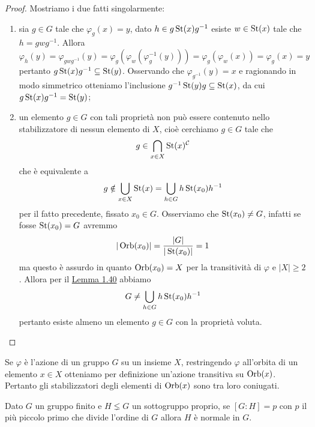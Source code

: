 \documentclass[11pt]{scrartcl}
\begin{document}
\begin{proof}
    Mostriamo i due fatti singolarmente:
    \begin{enumerate}[(1)]
        \item sia $g \in G$ tale che $\varphi_g(x) = y$, dato 
        $h \in g\operatorname{St}(x)g^{-1}$ esiste $w \in \operatorname{St}(x)$ tale che $h = gwg^{-1}$. 
        Allora
        \[
            \varphi_h(y) = \varphi_{gwg^{-1}}(y) = 
            \varphi_g(\varphi_w(\varphi_g^{-1}(y))) = \varphi_g(\varphi_w(x)) =
            \varphi_g(x) = y
        \]pertanto $g\operatorname{St}(x)g^{-1} \subseteq \operatorname{St}(y)$. Osservando che 
        $\varphi_{g^{-1}}(y) = x$ e ragionando in modo simmetrico otteniamo
        l'inclusione $g^{-1}\operatorname{St}(y)g \subseteq \operatorname{St}(x)$, da cui $g\operatorname{St}(x)g^{-1} = \operatorname{St}(y)$;
        \item un elemento $g \in G$ con tali proprietà non può essere contenuto 
        nello stabilizzatore di nessun elemento di $X$, cioè cerchiamo $g \in G$
        tale che
        \[
            g \in \bigcap_{x \in X}\operatorname{St}(x)^{\mathcal{C}}
        \]
        che è equivalente a
        \[
            g \notin \bigcup_{x \in X} \operatorname{St}(x) = \bigcup_{h \in G}h\operatorname{St}(x_0)h^{-1}
        \]per il fatto precedente, fissato $x_0 \in G$. Osserviamo che 
        $\operatorname{St}(x_0) \neq G$, infatti se fosse $\operatorname{St}(x_0) = G$ avremmo 
        \[
            |\operatorname{Orb}(x_0)| = \frac{|G|}{|\operatorname{St}(x_0)|} = 1
        \]ma questo è assurdo in quanto $\operatorname{Orb}(x_0) = X$ per la transitività di 
        $\varphi$ e $|X|\geqslant 2$. Allora per il \hyperref[lemma2.0]{Lemma 1.40}
        abbiamo 
        \[
            G \neq \bigcup_{h \in G}h\operatorname{St}(x_0)h^{-1}
        \]pertanto esiste almeno un elemento $g\in G$ con la proprietà voluta.
    \end{enumerate}
\end{proof}

\begin{remark}
    Se $\varphi$ è l'azione di un gruppo $G$ su un insieme $X$, restringendo
    $\varphi$ all'orbita di un elemento $x \in X$ otteniamo per definizione
    un'azione transitiva su $\operatorname{Orb}(x)$. Pertanto gli stabilizzatori degli elementi 
    di $\operatorname{Orb}(x)$ sono tra loro coniugati.
\end{remark}

\begin{proposition}
    Dato $G$ un gruppo finito e $H \lneq G$ un sottogruppo proprio, se $[G:H] = p$
    con $p$ il più piccolo primo che divide l'ordine di $G$ allora $H$ è normale
    in $G$.
\end{proposition}
\end{document}
